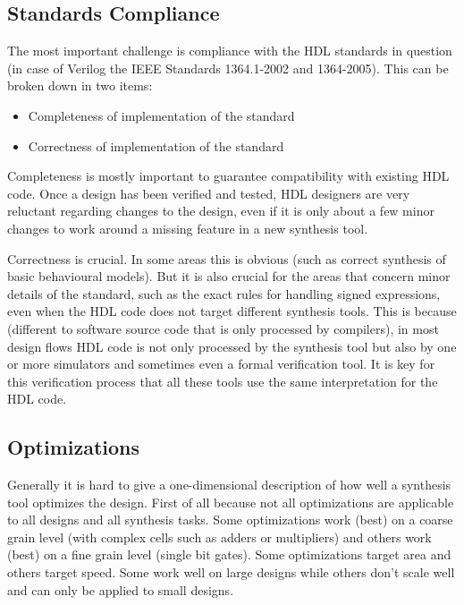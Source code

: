 \subsection{Standards Compliance}

The most important challenge is compliance with the HDL standards in question (in case
of Verilog the IEEE Standards 1364.1-2002 and 1364-2005). This can be broken down in two
items:

\begin{itemize}
\item Completeness of implementation of the standard
\item Correctness of implementation of the standard
\end{itemize}

Completeness is mostly important to guarantee compatibility
with existing HDL code. Once a design has been verified and tested, HDL designers
are very reluctant regarding changes to the design, even if it is only about
a few minor changes to work around a missing feature in a new synthesis tool.

Correctness is crucial. In some areas this is obvious (such as
correct synthesis of basic behavioural models). But it is also crucial for the
areas that concern minor details of the standard, such as the exact rules
for handling signed expressions, even when the HDL code does not target
different synthesis tools. This is because (different to software source code that
is only processed by compilers), in most design flows HDL code is not only
processed by the synthesis tool but also by one or more simulators and sometimes
even a formal verification tool. It is key for this verification process
that all these tools use the same interpretation for the HDL code.

\subsection{Optimizations}

Generally it is hard to give a one-dimensional description of how well a synthesis tool
optimizes the design. First of all because not all optimizations are applicable to all
designs and all synthesis tasks. Some optimizations work (best) on a coarse grain level
(with complex cells such as adders or multipliers) and others work (best) on a fine
grain level (single bit gates). Some optimizations target area and others target speed.
Some work well on large designs while others don't scale well and can only be applied 
to small designs.

